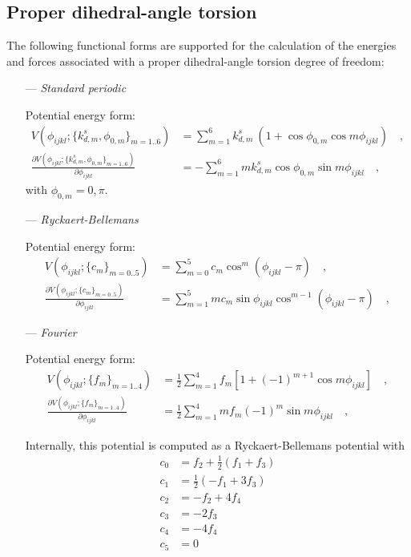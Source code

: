 \documentclass[10pt,a4paper,openany]{memoir}
\numberwithin{equation}{section}
\begin{document}
\subsection{Proper dihedral-angle torsion}
\label{sec:proper-terms}

The following functional forms are supported for the calculation of
the energies and forces associated with a proper dihedral-angle
torsion degree of freedom:\cite{GROMOS-doc,GROMACS-doc}

\begin{itemize}
\item [---] \textit{Standard periodic}
  \par
  Potential energy form:
  \begin{align}
    \label{eq:proper-standard-energy}
    V(\phi_{ijkl} ; \{k_{d,m}^s, \phi_{0,m}\}_{m=1..6}) & = \sum_{m=1}^{6} k_{d,m}^s\ (1 + \cos{\phi_{0,m}} \cos{m \phi_{ijkl}})\quad , \\ \nonumber
    \frac{\partial V(\phi_{ijkl} ; \{k_{d,m}^s, \phi_{0,m}\}_{m=1..6})}{\partial \phi_{ijkl}} & = -\sum_{m=1}^{6} m k_{d,m}^s \cos{\phi_{0,m}} \sin{m \phi_{ijkl}}\quad ,
  \end{align}
  with $\phi_{0,m}=0,\pi$.
  
\item [---]\textit{Ryckaert-Bellemans}
  \par
  Potential energy form:
  \begin{align}
    \label{eq:proper-rb-energy}
    V(\phi_{ijkl} ; \{c_m\}_{m=0..5}) & = \sum_{m=0}^{5} c_m \cos^m{(\phi_{ijkl}-\pi)} \quad , \\ \nonumber
    \frac{\partial V(\phi_{ijkl} ; \{c_m\}_{m=0..5})}{\partial \phi_{ijkl}} & = \sum_{m=1}^{5} mc_m \sin{\phi_{ijkl}} \cos^{m-1}{(\phi_{ijkl}-\pi)} \quad , 
  \end{align}

\item [---]\textit{Fourier}
  \par
  Potential energy form:
   \begin{align}
    \label{eq:proper-fourier-energy}
     V(\phi_{ijkl} ; \{f_m\}_{m=1..4}) & = \frac{1}{2} \sum_{m=1}^{4} f_m \left[1 + (-1)^{m+1}\cos m\phi_{ijkl}\right] \quad , \\ \nonumber
     \frac{\partial V(\phi_{ijkl} ; \{f_m\}_{m=1..4})}{\partial \phi_{ijkl}} & = \frac{1}{2} \sum_{m=1}^{4} m f_m (-1)^{m}\sin m\phi_{ijkl} \quad ,
   \end{align}
   
   Internally, this potential is computed as a Ryckaert-Bellemans potential with
   \begin{align*}
     c_0 & = f_2 + \frac{1}{2} (f_1 + f_3)\\
     c_1 & = \frac{1}{2} (-f_1 + 3f_3)\\
     c_2 & = -f_2 + 4f_4\\
     c_3 & = -2 f_3\\
     c_4 & = -4 f_4\\
     c_5 & = 0
   \end{align*}


\end{itemize}
\end{document}
